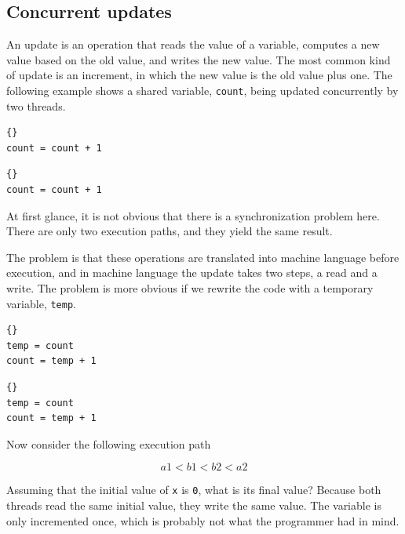 \documentclass{book}
\begin{document}
\subsection {Concurrent updates}

An update is an operation that reads the value of a variable, computes
a new value based on the old value, and writes the new value.
The most common kind of update is an increment, in which the
new value is the old value plus one.  The following example
shows a shared variable, {\tt count}, being updated concurrently
by two threads.

\begin{minipage}[t]{2in}
\begin{lstlisting}[title={Thread A}]{}
count = count + 1
\end{lstlisting}
\end{minipage}
\hfill
\begin{minipage}[t]{2in}
\begin{lstlisting}[title={Thread B}]{}
count = count + 1
\end{lstlisting}
\end{minipage}

At first glance, it is not obvious that there is a synchronization
problem here.  There are only two execution paths, and they
yield the same result.

The problem is that these operations are translated into
machine language before execution, and in machine language
the update takes two steps, a read and a write.
The problem is more obvious if we rewrite the code with a temporary
variable, {\tt temp}.

\begin{minipage}[t]{2in}
\begin{lstlisting}[title={Thread A}]{}
temp = count
count = temp + 1
\end{lstlisting}
\end{minipage}
\hfill
\begin{minipage}[t]{2in}
\begin{lstlisting}[title={Thread B}]{}
temp = count
count = temp + 1
\end{lstlisting}
\end{minipage}

Now consider the following execution path 

\[  a1 < b1 < b2 < a2  \]

Assuming that the
initial value of {\tt x} is {\tt 0},
what is its final value?  Because
both threads read the same initial value, they write
the same value.  The variable is only incremented once, which
is probably not what the programmer had in mind.
\end{document}
